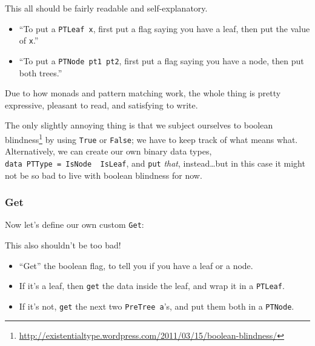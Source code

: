 \documentclass[]{article}
\newenvironment{Shaded}{}{}
\newcommand{\KeywordTok}[1]{\textcolor[rgb]{0.00,0.44,0.13}{\textbf{{#1}}}}
\newcommand{\DataTypeTok}[1]{\textcolor[rgb]{0.56,0.13,0.00}{{#1}}}
\newcommand{\CommentTok}[1]{\textcolor[rgb]{0.38,0.63,0.69}{\textit{{#1}}}}
\newcommand{\OtherTok}[1]{\textcolor[rgb]{0.00,0.44,0.13}{{#1}}}
\newcommand{\FunctionTok}[1]{\textcolor[rgb]{0.02,0.16,0.49}{{#1}}}
\newcommand{\NormalTok}[1]{{#1}}
\renewcommand{\href}[2]{#2\footnote{\url{#1}}}
\begin{document}
This all should be fairly readable and self-explanatory.

\begin{itemize}
\item
  ``To put a \texttt{PTLeaf\ x}, first put a flag saying you have a
  leaf, then put the value of \texttt{x}.''
\item
  ``To put a \texttt{PTNode\ pt1\ pt2}, first put a flag saying you have
  a node, then put both trees.''
\end{itemize}

Due to how monads and pattern matching work, the whole thing is pretty
expressive, pleasant to read, and satisfying to write.

The only slightly annoying thing is that we subject ourselves to
\href{http://existentialtype.wordpress.com/2011/03/15/boolean-blindness/}{boolean
blindness} by using \texttt{True} or \texttt{False}; we have to keep
track of what means what. Alternatively, we can create our own binary
data types, \texttt{data\ PTType\ =\ IsNode\ \textbar{}\ IsLeaf}, and
\texttt{put} \emph{that}, instead\ldots{}but in this case it might not
be so bad to live with boolean blindness for now.

\subsubsection{Get}\label{get}

Now let's define our own custom \texttt{Get}:

\begin{Shaded}
\end{Shaded}

This also shouldn't be too bad!

\begin{itemize}
\tightlist
\item
  ``Get'' the boolean flag, to tell you if you have a leaf or a node.
\item
  If it's a leaf, then \texttt{get} the data inside the leaf, and wrap
  it in a \texttt{PTLeaf}.
\item
  If it's not, \texttt{get} the next two \texttt{PreTree\ a}'s, and put
  them both in a \texttt{PTNode}.
\end{itemize}
\end{document}
